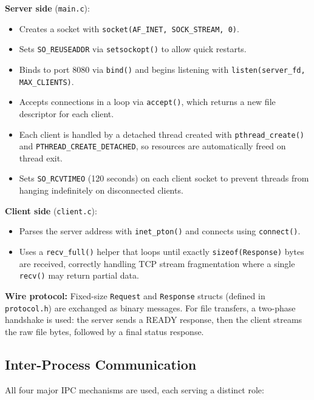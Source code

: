 \documentclass[12pt,a4paper]{article}
\begin{document}
\textbf{Server side} (\texttt{main.c}):
\begin{itemize}[itemsep=0.3em]
    \item Creates a socket with \texttt{socket(AF\_INET, SOCK\_STREAM, 0)}.
    \item Sets \texttt{SO\_REUSEADDR} via \texttt{setsockopt()} to allow quick restarts.
    \item Binds to port 8080 via \texttt{bind()} and begins listening with
          \texttt{listen(server\_fd, MAX\_CLIENTS)}.
    \item Accepts connections in a loop via \texttt{accept()}, which returns a new
          file descriptor for each client.
    \item Each client is handled by a detached thread created with
          \texttt{pthread\_create()} and \texttt{PTHREAD\_CREATE\_DETACHED}, so
          resources are automatically freed on thread exit.
    \item Sets \texttt{SO\_RCVTIMEO} (120 seconds) on each client socket to prevent
          threads from hanging indefinitely on disconnected clients.
\end{itemize}

\textbf{Client side} (\texttt{client.c}):
\begin{itemize}[itemsep=0.3em]
    \item Parses the server address with \texttt{inet\_pton()} and connects using
          \texttt{connect()}.
    \item Uses a \texttt{recv\_full()} helper that loops until exactly
          \texttt{sizeof(Response)} bytes are received, correctly handling TCP stream
          fragmentation where a single \texttt{recv()} may return partial data.
\end{itemize}

\textbf{Wire protocol:} Fixed-size \texttt{Request} and \texttt{Response} structs
(defined in \texttt{protocol.h}) are exchanged as binary messages. For file transfers,
a two-phase handshake is used: the server sends a READY response, then the client
streams the raw file bytes, followed by a final status response.

\subsection{Inter-Process Communication}

All four major IPC mechanisms are used, each serving a distinct role:
\end{document}
